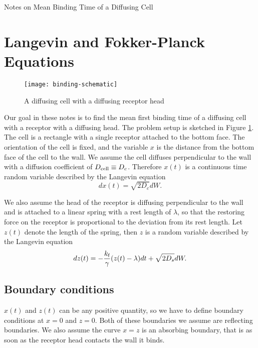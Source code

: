 \documentclass{article}
\newcommand{\tn}{\textnormal}
\newcommand{\stiff}{\frac{k_\tn{f}}{\gamma}}
\begin{document}
\pagestyle{empty}


\begin{center}
  {\Large Notes on Mean Binding Time of a Diffusing Cell}
\end{center}

\section{Langevin and Fokker-Planck Equations}

\begin{figure}
  \centering
  \texttt{[image: binding-schematic]}
  \caption{A diffusing cell with a diffusing receptor head}
  \label{fig:binding-schematic}
\end{figure}

Our goal in these notes is to find the mean first binding time of a
diffusing cell with a receptor with a diffusing head. The problem
setup is sketched in Figure \ref{fig:binding-schematic}. The cell is a
rectangle with a single receptor attached to the bottom face. The
orientation of the cell is fixed, and the variable $x$ is the distance
from the bottom face of the cell to the wall. We assume the cell
diffuses perpendicular to the wall with a diffusion coefficient of
$D_\tn{cell} \equiv D_c$. Therefore $x(t)$ is a continuous time random
variable described by the Langevin equation
\begin{equation}
  dx(t) = \sqrt{2D_c}dW.
  \label{eq:lang-x}
\end{equation}

We also assume the head of the receptor is diffusing perpendicular to
the wall and is attached to a linear spring with a rest length of
$\lambda$, so that the restoring force on the receptor is proportional
to the deviation from its rest length. Let $z(t)$ denote the length of
the spring, then $z$ is a random variable described by the Langevin
equation
\begin{equation}
  dz(t) = -\stiff (z(t) - \lambda) dt + \sqrt{2D_s} dW.
  \label{eq:lang-z}
\end{equation}

\subsection{Boundary conditions}

$x(t)$ and $z(t)$ can be any positive quantity, so we have to define
boundary conditions at $x = 0$ and $z = 0$. Both of these boundaries
we assume are reflecting boundaries. We also assume the curve $x = z$
is an absorbing boundary, that is as soon as the receptor head
contacts the wall it binds.
\end{document}
